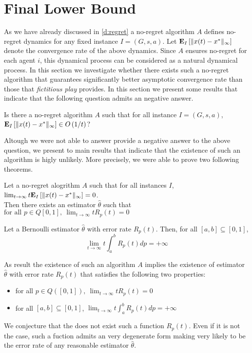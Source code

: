 \section{Final Lower Bound}
As we have already discussed in \ref{d:regret} a no-regret algorithm $A$ defines no-regret dynamics for any fixed instance $I=(G,s,a)$. 
Let $\bm{\mathrm{E}}_{I} \left[ \| x(t)-x^* \|_{\infty} \right]$ denote the convergence rate of the above dynamics. Since $A$ ensures no-regret for each agent $i$, this 
dynamical process can be considered as a natural dynamical process. In this section we investigate whether there exists such a no-regret algorithm that
guarantees significantly better asymptotic convergence rate than those that \emph{fictitious play} provides. In this section we present some results that 
indicate that the following question admits an negative answer.
\begin{question}
Is there a no-regret algorithm $A$ such that for all instance $I=(G,s,a)$, $\bm{\mathrm{E}}_{I} \left[ \| x(t)-x^* \|_{\infty} \right] \in O\left(1/t\right)$? 
\end{question}

\noindent Altough we were not able to answer provide a negative answer to the above question, we present to main results that indicate that the existence of such
an algorithm is higly unlikely. More precisely, we were able to prove two following theorems.

\begin{theorem}
Let a no-regret alogrithm $A$ such that for all instances $I$, $\lim_{t \rightarrow \infty} t\bm{\mathrm{E}}_{I} \left[ \| x(t)-x^* \|_{\infty} \right]=0$.\\
Then there exists an estimator $\hat{\theta}$ such that $\text{for all }p \in Q[0,1],~  \lim_{t \rightarrow \infty}tR_p(t)=0$
\end{theorem}

\begin{theorem}
Let a Bernoulli estimator $\hat{\theta}$ with error rate $R_p(t)$. Then, for all $[a,b] \subseteq [0,1]$,
\[ \lim_{t \to \infty}t \int_{a}^{b}R_p(t)dp = +\infty\]
\end{theorem} 

\noindent As result the existence of such an algorithm $A$ implies the existence of estimator $\hat{\theta}$ with error rate $R_p(t)$ that satisfies the following
two properties:
\begin{itemize}
 \item for all $p \in Q([0,1]),~ \lim_{t \rightarrow \infty}tR_p(t)=0$
 \item for all $[a,b] \subseteq [0,1]$, $\lim_{t \to \infty}t \int_{a}^{b}R_p(t)dp = +\infty$
\end{itemize}
\noindent We conjecture that the does not exist such a function $R_p(t)$. Even if it is not the case, such a fuction admits an very degenerate form making very likely to be
the error rate of any reasonable estimator $\hat{\theta}$. 



